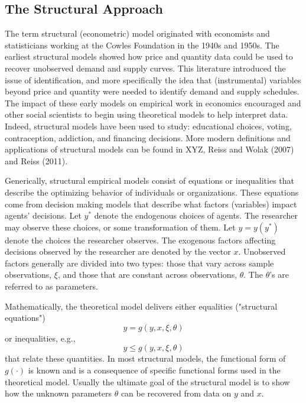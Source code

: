 \documentclass[14pt]{article}
\begin{document}
\subsection{The Structural Approach}

The term structural (econometric) model originated with economists and statisticians working at
the Cowles Foundation in the 1940s and 1950s. The earliest structural models showed how price 
and quantity data could be used to recover unobserved demand and supply curves. This literature
introduced the issue of identification, and more specifically the idea that (instrumental)
variables beyond price and quantity were needed to identify demand and
supply schedules. The impact of these early models on empirical work in economics 
encouraged and other social scientists to begin using theoretical models to help interpret 
data. Indeed, structural models have been used to study: educational choices, voting, 
contraception, addiction, and financing decisions. More modern definitions and applications 
of structural models can be found in XYZ, Reiss and Wolak (2007) and Reiss (2011). 

Generically, structural empirical models consist of equations or inequalities that describe 
the optimizing behavior of individuals or organizations. These equations come from decision making
models that describe what factors (variables) impact agents' decisions. Let $y^*$ denote the endogenous choices 
of agents. The researcher may observe these choices, or some transformation of them.
Let $y=y(y^*)$ denote the choices the researcher observes. The exogenous factors affecting
decisions observed by the researcher are denoted by the vector $x$. Unobserved factors generally
are divided into two types: those that vary across sample observations, $\xi$, and
those that are constant across observations, $\theta$. The $\theta$'s are referred to
as parameters.

Mathematically, the theoretical model delivers either equalities ("structural equations")
$$  y = g(y, x,\xi ,\theta)$$ 
or inequalities, e.g.,
$$  y \le g(y, x,\xi ,\theta)$$
that relate these quantities. In most structural models, the functional form of $g(\cdot)$ is known
and is a consequence of specific functional forms used in the theoretical model. 
Usually the ultimate goal of the structural model is to show how the unknown parameters 
$\theta$ can be recovered from data on $y$ and $x$. 
\end{document}
